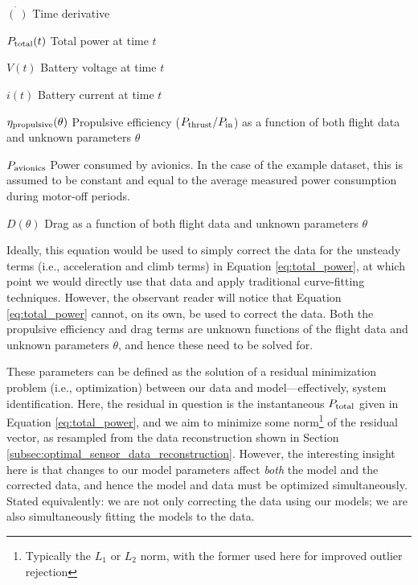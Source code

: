 \documentclass[conf]{new-aiaa}
\begin{document}
    \begin{eqexpl}
        \item {$\dot{(\:)}$} Time derivative
        \item {$P_{\rm total}(t)$} Total power at time $t$
        \item {$V(t)$} Battery voltage at time $t$
        \item {$i(t)$} Battery current at time $t$
        \item {$\eta_{\rm propulsive}(\theta)$} Propulsive efficiency ($P_{\rm thrust} / P_{\rm in}$) as a function of both flight data and unknown parameters $\theta$
        \item {$P_{\rm avionics}$} Power consumed by avionics. In the case of the example dataset, this is assumed to be constant and equal to the average measured power consumption during motor-off periods.
        \item {$D(\theta)$} Drag as a function of both flight data and unknown parameters $\theta$
    \end{eqexpl}

    Ideally, this equation would be used to simply correct the data for the unsteady terms (i.e., acceleration and climb terms) in Equation \ref{eq:total_power}, at which point we would directly use that data and apply traditional curve-fitting techniques. However, the observant reader will notice that Equation \ref{eq:total_power} cannot, on its own, be used to correct the data. Both the propulsive efficiency and drag terms are unknown functions of the flight data and unknown parameters $\theta$, and hence these need to be solved for.

    These parameters can be defined as the solution of a residual minimization problem (i.e., optimization) between our data and model—effectively, system identification. Here, the residual in question is the instantaneous $P_{\rm total}$ given in Equation \ref{eq:total_power}, and we aim to minimize some norm\footnote{Typically the $L_1$ or $L_2$ norm, with the former used here for improved outlier rejection} of the residual vector, as resampled from the data reconstruction shown in Section \ref{subsec:optimal_sensor_data_reconstruction}. However, the interesting insight here is that changes to our model parameters affect \textit{both} the model and the corrected data, and hence the model and data must be optimized simultaneously. Stated equivalently: we are not only correcting the data using our models; we are also simultaneously fitting the models to the data.
\end{document}
